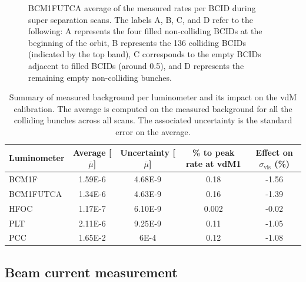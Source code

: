 \begin{figure}[!htb]
	\centering
	\caption[BCM1FUTCA hits in super-separation scan]{BCM1FUTCA average of the measured rates per BCID during super separation scans. The labels A, B, C, and D refer to the following: A represents the four filled non-colliding BCIDs at the beginning of the orbit, B represents the 136 colliding BCIDs (indicated by the top band), C corresponds to the empty BCIDs adjacent to filled BCIDs (around 0.5), and D represents the remaining empty non-colliding bunches.}
	\label{fig:8999SuperSeparation_BCM1FUTCA}
\end{figure}

\begin{table}[!htb]
	\centering
	\caption[Background impact on calibration]{Summary of measured background per luminometer and its impact on the vdM calibration. The average is computed on the measured background for all the colliding bunches across all scans. The associated uncertainty is the standard error on the average.}
	\begin{tabular}{lcccc}
		\hline
		Luminometer & Average [$\overline{\mu}$] & Uncertainty [$\overline{\mu}$] & \% to peak rate at vdM1 & Effect on $\sigma_{\mathrm{vis}}$ (\%) \\
		\hline
		BCM1F & 1.59E-6 & 4.68E-9 & 0.18 & -1.56 \\
		BCM1FUTCA & 1.34E-6 & 4.63E-9 & 0.16 & -1.39 \\
		HFOC & 1.17E-7 & 6.10E-9 & 0.002 & -0.02 \\
		PLT & 2.11E-6 & 9.25E-9 & 0.11 & -1.05 \\
		PCC & 1.65E-2 & 6E-4 & 0.12 & -1.08 \\
		\hline
	\end{tabular}
	\label{tab:ss_summary}
\end{table}

\subsection{Beam current measurement}
\label{subsec:beam_current_measurement}

